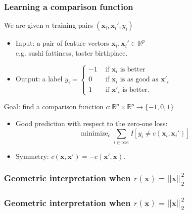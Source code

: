 \documentclass{beamer}
\DeclareMathOperator*{\minimize}{minimize}
\newcommand{\RR}{\mathbb R}
\begin{document}
\begin{frame}
  \frametitle{Learning a comparison function}
  We are given $n$ training pairs $(\mathbf x_i,\mathbf x_i',y_i)$ 
  \begin{itemize}
  \item Input: a pair of feature vectors $\mathbf x_i,\mathbf x_i'\in\RR^p$\\
    e.g. sushi fattiness, taster birthplace.
  \item Output: a label $y_i=
  \begin{cases}
    -1 & \text{ if $\mathbf x_i$ is better}\\
    0 & \text{ if $\mathbf x_i$ is as good as $\mathbf x'_i$}\\
    1 & \text{ if $\mathbf x'_i$ is better}.
  \end{cases}
$
  \end{itemize}
  Goal: find a comparison function
  $c:\RR^p\times\RR^p\rightarrow\{-1,0,1\}$
\begin{itemize}
\item Good prediction with respect to the zero-one loss:
$$\minimize_c \sum_{i\in\text{test}} 
I\left[ y_i \neq c(\mathbf x_i,\mathbf x_i') \right]$$
\item Symmetry: $c(\mathbf x,\mathbf x') = -c(\mathbf x',\mathbf x)$.
\end{itemize}
\end{frame}

\begin{frame}
  \frametitle{Geometric interpretation when $r(\mathbf x)=||\mathbf
    x||_2^2$}
  \begin{minipage}{1.0\linewidth}
    \hskip -0.5cm
      
  \end{minipage}
\end{frame}

\begin{frame}
  \frametitle{Geometric interpretation when $r(\mathbf x)=||\mathbf
    x||_2^2$}
  \begin{minipage}{1.0\linewidth}
    \hskip -0.5cm
  
  \end{minipage}
\end{frame}
\end{document}
